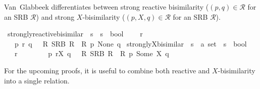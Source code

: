 \begin{isabellebody}
{}
\isamarkuptrue%
%
\endisatagdocument
{\isafolddocument}%
%
\isadelimdocument
%
\endisadelimdocument
%
\begin{isamarkuptext}%
Van~Glabbeek differentiates between strong reactive bisimilarity ($(p,q) \in \mathcal{R}$ for an SRB $\mathcal{R}$) and strong $X$-bisimilarity ($(p,X,q) \in \mathcal{R}$ for an SRB $\mathcal{R}$).%
\end{isamarkuptext}\isamarkuptrue%
\isamarkupfalse%
\ strongly{\isacharunderscore}{\kern0pt}reactive{\isacharunderscore}{\kern0pt}bisimilar\ {\isacharcolon}{\kern0pt}{\isacharcolon}{\kern0pt}\ {\isacartoucheopen}{\isacharprime}{\kern0pt}s\ {\isasymRightarrow}\ {\isacharprime}{\kern0pt}s\ {\isasymRightarrow}\ bool{\isacartoucheclose}\ \isanewline
\ \ {\isacharparenleft}{\kern0pt}{\isacartoucheopen}{\isacharunderscore}{\kern0pt}\ {\isasymleftrightarrow}\isactrlsub r\ {\isacharunderscore}{\kern0pt}{\isacartoucheclose}\ {\isacharbrackleft}{\kern0pt}{}{}{\isacharcomma}{\kern0pt}\ {}{}{\isacharbrackright}{\kern0pt}\ {}{}{\isacharparenright}{\kern0pt}\isanewline
\ \ \ {\isacartoucheopen}p\ {\isasymleftrightarrow}\isactrlsub r\ q\ {\isasymequiv}\ {\isasymexists}\ R{\isachardot}{\kern0pt}\ SRB\ R\ {\isasymand}\ R\ p\ None\ q{\isacartoucheclose}\isanewline
\isanewline
{}\isamarkupfalse%
\ strongly{\isacharunderscore}{\kern0pt}X{\isacharunderscore}{\kern0pt}bisimilar\ {\isacharcolon}{\kern0pt}{\isacharcolon}{\kern0pt}\ {\isacartoucheopen}{\isacharprime}{\kern0pt}s\ {\isasymRightarrow}\ {\isacharprime}{\kern0pt}a\ set\ {\isasymRightarrow}\ {\isacharprime}{\kern0pt}s\ {\isasymRightarrow}\ bool{\isacartoucheclose}\ \isanewline
\ \ {\isacharparenleft}{\kern0pt}{\isacartoucheopen}{\isacharunderscore}{\kern0pt}\ {\isasymleftrightarrow}\isactrlsub r\isactrlsup {\isacharunderscore}{\kern0pt}\ {\isacharunderscore}{\kern0pt}{\isacartoucheclose}\ {\isacharbrackleft}{\kern0pt}{}{}{\isacharcomma}{\kern0pt}\ {}{}{\isacharcomma}{\kern0pt}\ {}{}{\isacharbrackright}{\kern0pt}\ {}{}{\isacharparenright}{\kern0pt}\isanewline
\ \ \ {\isacartoucheopen}p\ {\isasymleftrightarrow}\isactrlsub r\isactrlsup X\ q\ {\isasymequiv}\ {\isasymexists}\ R{\isachardot}{\kern0pt}\ SRB\ R\ {\isasymand}\ R\ p\ {\isacharparenleft}{\kern0pt}Some\ X{\isacharparenright}{\kern0pt}\ q{\isacartoucheclose}%
\begin{isamarkuptext}%
For the upcoming proofs, it is useful to combine both reactive and $X$-bisimilarity into a single relation.%

\end{isamarkuptext}
\end{isabellebody}
